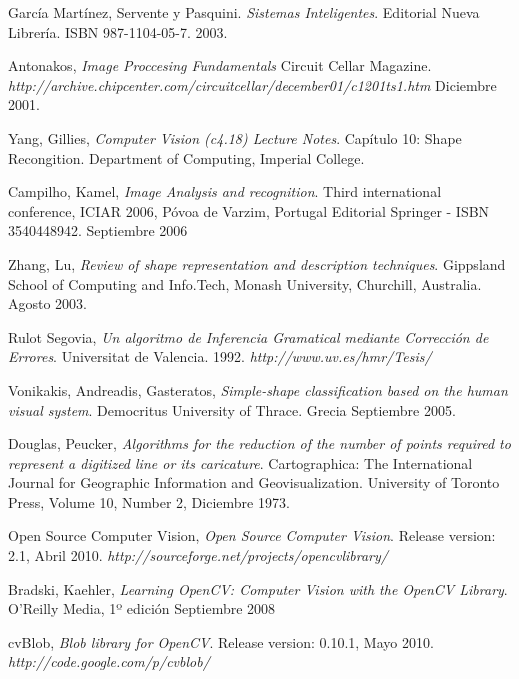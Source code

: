 \documentclass[pdftex,a4paper,10.5pt]{article}
\begin{document}
\begin{thebibliography}{9}

 García Mart\'inez, Servente y Pasquini.
 \emph{Sistemas Inteligentes}.
 Editorial Nueva Librer\'ia.
 ISBN 987-1104-05-7. 
 2003.	

  Antonakos,
  \emph{Image Proccesing Fundamentals}
  Circuit Cellar Magazine.
  \textsl{http://archive.chipcenter.com/circuitcellar/december01/c1201ts1.htm}
  Diciembre 2001.

  Yang, Gillies,  
  \emph{Computer Vision (c4.18) Lecture Notes}.
  Cap\'itulo 10: Shape Recongition.
  Department of Computing, Imperial College.
  
  Campilho, Kamel, 
  \emph{Image Analysis and recognition}. 
  Third international conference, ICIAR 2006, Póvoa de Varzim, Portugal
  Editorial Springer - ISBN	3540448942.
  Septiembre 2006
 

  Zhang, Lu, 
  \emph{Review of shape representation and description techniques}. 
  Gippsland School of Computing and Info.Tech, Monash University, Churchill, Australia. 
  Agosto 2003. 

    Rulot Segovia,  
  \emph{Un algoritmo de Inferencia Gramatical mediante Correcci\'on de Errores}.
  Universitat de Valencia.
  1992. \textsl{http://www.uv.es/hmr/Tesis/}

  Vonikakis, Andreadis, Gasteratos, 
  \emph{Simple-shape classification based on the human visual system}. 
  Democritus University of Thrace. Grecia 
  Septiembre 2005. 
  
  Douglas, Peucker, 
  \emph{Algorithms for the reduction of the number of points required to represent a digitized line or its caricature}. Cartographica: The International Journal for Geographic Information and Geovisualization.
  University of Toronto Press,
  Volume 10, Number 2,
  Diciembre 1973.

  Open Source Computer Vision, 
  \emph{Open Source Computer Vision}. 
  Release version: 2.1, 
  Abril 2010.
  \textsl{http://sourceforge.net/projects/opencvlibrary/}
  
  Bradski, Kaehler,
  \emph{Learning OpenCV: Computer Vision with the OpenCV Library}.
  O'Reilly Media, 1º edici\'on 
  Septiembre 2008
  
  cvBlob, 
  \emph{Blob library for OpenCV}. 
  Release version: 0.10.1, 
  Mayo 2010.
  \textsl{http://code.google.com/p/cvblob/}


\end{thebibliography}
\end{document}
